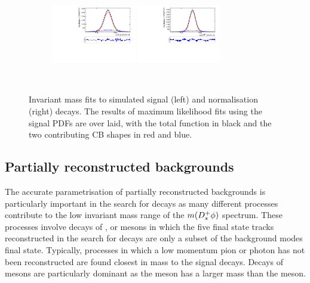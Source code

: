 \begin{figure}[!h]
   \begin{subfigure}[t]{1.0\textwidth}
      \centering
      \includegraphics[width=0.40\textwidth]{figs/B2DsPhi/Plot_Signal_Fit_All_B2PhiDs_Ds2KPiPi.pdf}
      \includegraphics[width=0.40\textwidth]{figs/B2DsPhi/Plot_Signal_Fit_All_B2D0Ds_Ds2KPiPi.pdf}
      \caption{\decay{\Dsp}{\Kp\pim\pip}}
   \end{subfigure}\\
   \caption{Invariant mass fits to simulated signal (left) and normalisation (right) decays. The results of maximum likelihood fits using the signal PDFs are over laid, with the total function in black and the two contributing CB shapes in red and blue.}
   \label{fig:B2DsPhi_signal_fits}   
\end{figure}


\subsection{Partially reconstructed backgrounds}
\label{sec:B2DsPhi_partrecocomps}

The accurate parametrisation of partially reconstructed backgrounds is particularly important in the search for \decay{\Bp}{\Dsp\phiz} decays as many different processes contribute to the low invariant mass range of the $m({{D}^+_{s}}\phi)$ spectrum. These processes involve decays of \Bs, \Bz or \Bp mesons in which the five final state tracks reconstructed in the search for \decay{\Bp}{\Dsp\phiz} decays are only a subset of the background modes final state. 
Typically, processes in which a low momentum pion or photon has not been reconstructed are found closest in mass to the signal decays. Decays of \Bs mesons are particularly dominant as the \Bs meson has a larger mass than the \Bp meson.   


